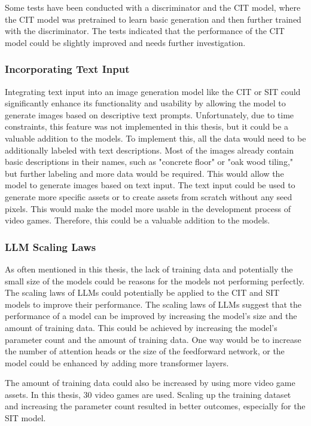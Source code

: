     Some tests have been conducted with a discriminator and the CIT model, where the CIT model was pretrained to learn basic generation and then further trained with the discriminator. The tests indicated that the performance of the CIT model could be slightly improved and needs further investigation.

    \subsubsection{Incorporating Text Input}

    Integrating text input into an image generation model like the CIT or SIT could significantly enhance its functionality and usability by allowing the model to generate images based on descriptive text prompts. Unfortunately, due to time constraints, this feature was not implemented in this thesis, but it could be a valuable addition to the models. To implement this, all the data would need to be additionally labeled with text descriptions. Most of the images already contain basic descriptions in their names, such as "concrete floor" or "oak wood tiling," but further labeling and more data would be required. This would allow the model to generate images based on text input. The text input could be used to generate more specific assets or to create assets from scratch without any seed pixels. This would make the model more usable in the development process of video games. Therefore, this could be a valuable addition to the models.

    \subsubsection{LLM Scaling Laws}

    As often mentioned in this thesis, the lack of training data and potentially the small size of the models could be reasons for the models not performing perfectly. The scaling laws of LLMs \autocite{kaplan2020scaling} could potentially be applied to the CIT and SIT models to improve their performance. The scaling laws of LLMs suggest that the performance of a model can be improved by increasing the model's size and the amount of training data. This could be achieved by increasing the model's parameter count and the amount of training data. One way would be to increase the number of attention heads or the size of the feedforward network, or the model could be enhanced by adding more transformer layers. 
    
    The amount of training data could also be increased by using more video game assets. In this thesis, 30 video games are used. Scaling up the training dataset and increasing the parameter count resulted in better outcomes, especially for the SIT model.
